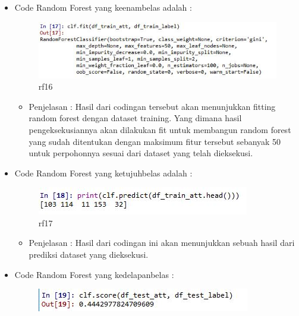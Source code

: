 \begin{enumerate}
\begin{itemize}
\begin{itemize}
\par
\par
\end{itemize}
\item Code Random Forest yang keenambelas adalah :
\par
\begin{figure}[ht]
\centering
\includegraphics[scale=0.4]{figures/rfcahya16.jpg}
\caption{rf16}
\label{contoh}
\end{figure}
\par
\begin{itemize}
\item Penjelasan : Hasil dari codingan tersebut akan menunjukkan fitting random forest dengan dataset training. Yang dimana hasil pengeksekusiannya akan dilakukan fit untuk membangun random forest yang sudah ditentukan dengan maksimum fitur tersebut sebanyak 50 untuk perpohonnya sesuai dari dataset yang telah dieksekusi.
\par
\par
\end{itemize}
\item Code Random Forest yang ketujuhbelas adalah :
\par
\begin{figure}[ht]
\centering
\includegraphics[scale=0.4]{figures/rfcahya17.jpg}
\caption{rf17}
\label{contoh}
\end{figure}
\par
\begin{itemize}
\item Penjelasan : Hasil dari codingan ini akan menunjukkan sebuah hasil dari prediksi dataset yang dieksekusi. 
\par
\par
\end{itemize}
\item Code Random Forest yang kedelapanbelas :
\par
\begin{figure}[ht]
\centering
\includegraphics[scale=0.4]{figures/rfcahya18.jpg}

\end{figure}
\end{itemize}
\end{enumerate}
